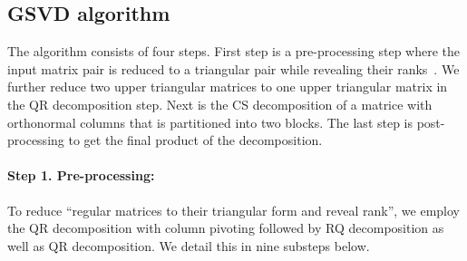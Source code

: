  \subsection{GSVD algorithm} \label{alg}
The algorithm consists of four steps. First step 
is a pre-processing step where the input matrix pair is
reduced to a triangular pair while revealing their ranks~\cite{bai1993new}.
We further reduce two upper triangular matrices to one upper triangular matrix in the QR decomposition step. Next is the CS decomposition of a matrice with orthonormal columns that is partitioned into two blocks. \cite{van1976generalizing} The last step is post-processing to get the final product of the decomposition. 
    
\paragraph{Step 1. Pre-processing:}
To reduce ``regular matrices to their triangular form and reveal rank'', 
we employ the QR decomposition with column pivoting followed by 
RQ decomposition \cite{golub2013matrix} as well as QR decomposition. 
We detail this in nine substeps below.
            
